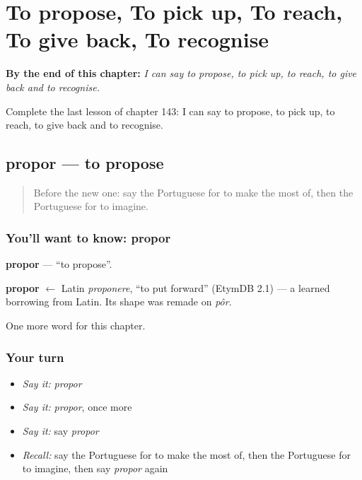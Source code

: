 
\chapter{To propose, To pick up, To reach, To give back, To recognise}
\label{ch:pt-to-propose-to-pick-up-to-reach-to-give-back-to-recognise}

\begin{chapteropening}
\textbf{By the end of this chapter:} \emph{I can say to propose, to pick up, to reach, to give back and to recognise.}

Complete the last lesson of chapter 143: I can say to propose, to pick up, to reach, to give back and to recognise.
\end{chapteropening}

\section[propor]{propor — to propose}

\label{lesson:PT-C143-propor}



\begin{quote}
Before the new one: say the Portuguese for to make the most of, then the Portuguese for to imagine.
\end{quote}

\subsection*{You'll want to know: propor}
\textbf{propor} — \textquotedblleft{}to propose\textquotedblright{}.

\begin{cousinweb}
\textbf{propor} $\leftarrow$ Latin \emph{proponere}, \textquotedblleft{}to put forward\textquotedblright{} (EtymDB 2.1) — a learned borrowing from Latin. Its shape was remade on \emph{pôr}.
\end{cousinweb}

\begin{grammarlens}[title={What you've built}]
One more word for this chapter.
\end{grammarlens}

\subsection*{Your turn}
\begin{itemize}
\raggedright
  \item \emph{Say it:} \emph{propor}
  \item \emph{Say it:} \emph{propor}, once more
  \item \emph{Say it:} say \emph{propor}
  \item \emph{Recall:} say the Portuguese for to make the most of, then the Portuguese for to imagine, then say \emph{propor} again
\end{itemize}

